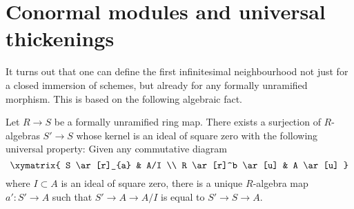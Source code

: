 \section{Conormal modules and universal thickenings}
\label{section-conormal}

\noindent
It turns out that one can define the first infinitesimal neighbourhood
not just for a closed immersion of schemes, but already for any formally
unramified morphism. This is based on the following algebraic fact.

\begin{lemma}
\label{lemma-universal-thickening}
Let $R \to S$ be a formally unramified ring map. There exists a surjection of
$R$-algebras $S' \to S$ whose kernel is an ideal of square zero with the
following universal property: Given any commutative diagram
$$
\xymatrix{
S \ar[r]_{a} & A/I \\
R \ar[r]^b \ar[u] & A \ar[u]
}
$$
where $I \subset A$ is an ideal of square zero, there is a unique $R$-algebra
map $a' : S' \to A$ such that $S' \to A \to A/I$ is equal to $S' \to S \to A$.
\end{lemma}

